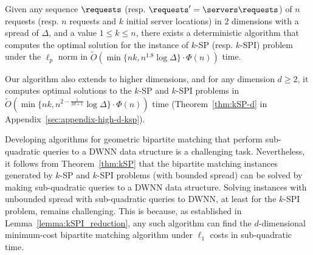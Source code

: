 
\begin{theorem}\label{thm:kSP}
Given any sequence $\requests$ (resp. $\requests'=\servers\requests$) of $n$ requests (resp. $n$ requests and $k$ initial server locations) in $2$ dimensions with a spread of $\Delta$, and a value $1 \le k \le n$, there exists a deterministic algorithm that computes the optimal solution for the instance of $k$-SP (resp. $k$-SPI) problem under the $\ell_p$ norm in $\tilde{O}(\min\{nk, n^{1.8}\log \Delta\}\cdot\Phi(n))$ time.
\end{theorem}

Our algorithm also extends to higher dimensions, and for any dimension $d\ge 2$, it computes optimal solutions to the $k$-SP and $k$-SPI problems in $\tilde{O}(\min\{nk, n^{2-\frac{1}{2d+1}}\log \Delta\}\cdot\Phi(n))$ time (Theorem~\ref{thm:kSP-d} in Appendix~\ref{sec:appendix-high-d-ksp}). 




Developing algorithms for geometric bipartite matching that perform sub-quadratic queries to a DWNN data structure is a challenging task. Nevertheless, it follows from Theorem~\ref{thm:kSP} that the bipartite matching instances generated by $k$-SP and $k$-SPI problems (with bounded spread) can be solved by making sub-quadratic queries to a DWNN data structure. Solving instances with unbounded spread with sub-quadratic queries to DWNN, at least for the $k$-SPI problem, remains challenging. This is because, as established in Lemma~\ref{lemma:kSPI_reduction}, any such  
algorithm can find the $d$-dimensional minimum-cost bipartite matching algorithm under $\ell_1$ costs in sub-quadratic time.  

